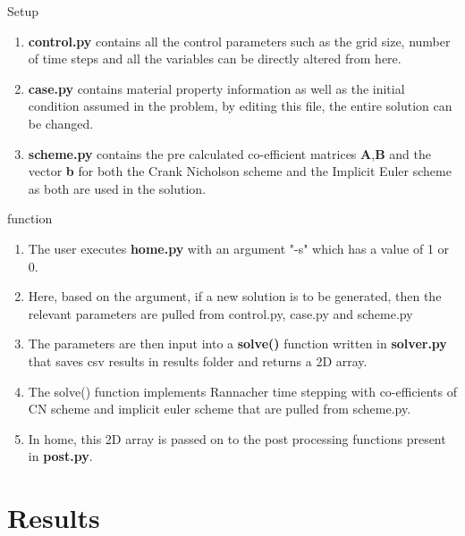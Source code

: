 \documentclass[10pt,compress]{beamer}
\begin{document}
\begin{frame}{Setup}
\begin{enumerate}
	\item \textbf{control.py} contains all the control parameters such as the grid size, number of time steps and all the variables can be directly altered from here.
	\item \textbf{case.py} contains material property  information as well as the initial condition assumed in the problem, by editing this file, the entire solution can be changed.
	\item \textbf{scheme.py} contains the pre calculated co-efficient matrices \textbf{A},\textbf{B} and the vector \textbf{b} for both the Crank Nicholson scheme and the Implicit Euler scheme as both are used in the solution. 
\end{enumerate}
\end{frame}

\begin{frame}{function}
\begin{enumerate}
\item The user executes \textbf{home.py} with an argument "-s" which has a value of 1 or 0.
\item Here, based on the argument, if a new solution is to be generated, then the relevant parameters are pulled from control.py, case.py and scheme.py
\item The parameters are then input into a \textbf{solve()} function written in \textbf{solver.py} that saves csv results in results folder and returns a 2D array.
\item The solve() function implements Rannacher time stepping with co-efficients of CN scheme and implicit euler scheme that are pulled from scheme.py.
\item In home, this 2D array is passed on to the post processing functions present in \textbf{post.py}.
\end{enumerate}
\end{frame}
\section{Results}
\end{document}
